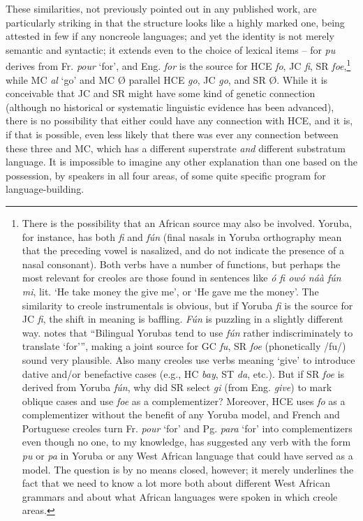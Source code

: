 These similarities, not previously pointed out in any published work, are particularly striking in that the structure looks like a highly marked one, being attested in few if any noncreole languages; and yet the identity is not merely semantic and syntactic; it extends even to the choice of lexical items -- for \textit{pu} derives from Fr. \textit{pour} `for', and Eng. \textit{for} is the source for HCE \textit{fo}, JC \textit{fi}, SR \textit{foe},\footnote{There is the possibility that an African source may also be involved. Yoruba, for instance, has both \textit{fi} and \textit{f{\'u}n} (final nasals in Yoruba orthography mean that the preceding vowel is nasalized, and do not indicate the presence of a nasal consonant). Both verbs have a number of functions, but perhaps the most relevant for creoles are those found in sentences like \textit{{\'o} fi ow{\'o} n\'a\`a f\'un mi}, lit. `He take money the give me', or `He gave me the money'. The similarity to creole instrumentals is obvious, but if Yoruba \textit{fi} is the source for JC \textit{fi}, the shift in meaning is baffling. \textit{F\'un} is puzzling in a slightly different way. \citet{Rowlands1969} notes that ``Bilingual Yorubas tend to use \textit{f\'un} rather indiscriminately to translate `for''', making a joint source for GC \textit{fu}, SR \textit{foe} (phonetically /fu/) sound very plausible. Also many creoles use %
verbs meaning `give' to introduce dative and/or benefactive cases (e.g., HC \textit{bay}, ST \textit{da}, etc.). But if SR \textit{foe} is derived from Yoruba \textit{f\'un}, why did SR select \textit{gi} (from Eng. \textit{give}) to mark oblique cases and use \textit{foe} as a complementizer? Moreover, HCE uses \textit{fo} as a complementizer without the benefit of any Yoruba model, and French and Portuguese creoles turn Fr. \textit{pour} `for' and Pg. \textit{para} `for' into complementizers even though no one, to my knowledge, has suggested any verb with the form \textit{pu} or \textit{pa} in Yoruba or any West African language that could have served as a model. The question is by no means closed, however; it merely underlines the fact that we need to know a lot more both about different West African grammars and about what African lan\-guages were spoken in which creole areas.} while MC \textit{al} `go' and MC {\O} parallel HCE \textit{go}, JC \textit{go}, and SR {\O}. While it is conceivable that JC and SR might have some kind of genetic connection (although no historical or systematic linguistic evidence has been advanced), there is no possi\-bility that either could have any connection with HCE, and it is, if that is possible, even less likely that there was ever any connection between these three and MC, which has a different superstrate \textit{and} different substratum language. It is impossible to imagine any other
explanation than one based on the possession, by speakers in all four areas, of some quite specific program for language-building.

